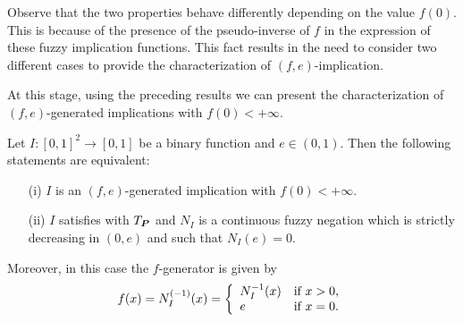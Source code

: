Observe that the two properties behave differently depending on the value $f(0)$. This is because of the presence of the pseudo-inverse of $f$ in the expression of these fuzzy implication functions. This fact results in the need to consider two different cases to provide the characterization of $(f,e)$-implication.


At this stage, using the preceding results we can present the characterization of $(f,e)$-generated implications with $f(0)<+\infty$.

\begin{theorem}\label{caractf0fin}
	Let $I:[0,1]^2\to [0,1]$ be a binary function and $e\in(0,1)$. Then the following statements are equivalent:
	\begin{enumerate}
		\item[(i)] $I$ is an $(f,e)$-generated implication with $f(0)<+\infty$.
		\item[(ii)] $I$ satisfies \LIey with $T_{\bm{P}}$ and $N_I$ is a continuous fuzzy negation which is strictly decreasing in $(0,e)$ and such that $N_I(e)=0$.
	\end{enumerate}
	Moreover, in this case the $f$-generator is given by 
	\begin{equation}f(x)=N_{I}^{(-1)}(x)=\left\{\begin{array}{ll} N_I^{-1}(x)&\hbox{if } x >0,\\ e&\hbox{if } x=0.\end{array}\right.
		\label{GenFinites}
	\end{equation}
\end{theorem}

